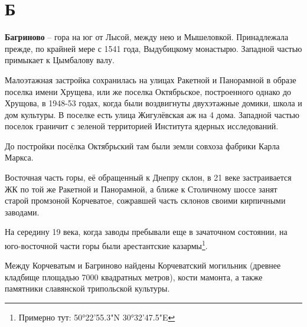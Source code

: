 \chapter*{Б}






\textbf{Багриново} – гора на юг от Лысой, между нею и Мышеловкой. Принадлежала прежде, по крайней мере с 1541 года, Выдубицкому монастырю. Западной частью примыкает к Цымбалову валу.

Малоэтажная застройка сохранилась на улицах Ракетной и Панорамной в образе поселка имени Хрущева, или же поселка Октябрьское, построенного однако до Хрущова, в 1948-53 годах, когда были воздвигнуты двухэтажные домики, школа и дом культуры. В поселке есть улица Жигулёвская аж на 4 дома. Западной частью поселок граничит с зеленой территорией Института ядерных исследований.

До постройки посёлка Октябрьский там были земли совхоза фабрики Карла Маркса.

Восточная часть горы, её обращенный к Днепру склон, в 21 веке застраивается ЖК по той же Ракетной и Панорамной, а ближе к Столичному шоссе занят старой промзоной Корчеватое, сожравшей часть склонов своими кирпичными заводами.

На середину 19 века, когда заводы пребывали еще в зачаточном состоянии, на юго-восточ\-ной части горы были арестантские казармы\footnote{Примерно тут: 50°22'55.3"N 30°32'47.5"E}.

Между Корчеватым и Багриново найдены Корчеватский могильник (древнее кладбище площадью 7000 квадратных метров), кости мамонта, а также памятники славянской трипольской культуры.

